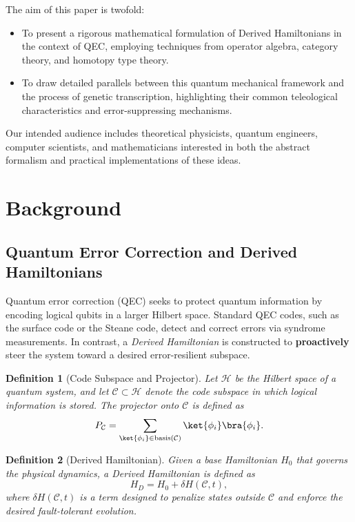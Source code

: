 \documentclass[11pt]{article}
\newtheorem{definition}{Definition}[section]
\begin{document}
The aim of this paper is twofold:
\begin{itemize}
    \item To present a rigorous mathematical formulation of Derived Hamiltonians in the context of QEC, employing techniques from operator algebra, category theory, and homotopy type theory.
    \item To draw detailed parallels between this quantum mechanical framework and the process of genetic transcription, highlighting their common teleological characteristics and error-suppressing mechanisms.
\end{itemize}

Our intended audience includes theoretical physicists, quantum engineers, computer scientists, and mathematicians interested in both the abstract formalism and practical implementations of these ideas.

\section{Background}
\subsection{Quantum Error Correction and Derived Hamiltonians}
Quantum error correction (QEC) seeks to protect quantum information by encoding logical qubits in a larger Hilbert space. Standard QEC codes, such as the surface code or the Steane code, detect and correct errors via syndrome measurements. In contrast, a \emph{Derived Hamiltonian} is constructed to \textbf{proactively} steer the system toward a desired error-resilient subspace.

\begin{definition}[Code Subspace and Projector]
Let $\mathcal{H}$ be the Hilbert space of a quantum system, and let $\mathcal{C} \subset \mathcal{H}$ denote the \emph{code subspace} in which logical information is stored. The projector onto $\mathcal{C}$ is defined as
\[
P_{\mathcal{C}} = \sum_{\ket{\phi_i}\in \mathrm{basis}(\mathcal{C})} \ket{\phi_i}\bra{\phi_i}.
\]
\end{definition}

\begin{definition}[Derived Hamiltonian]
Given a base Hamiltonian $H_0$ that governs the physical dynamics, a \emph{Derived Hamiltonian} is defined as
\[
H_D = H_0 + \delta H(\mathcal{C}, t),
\]
where $\delta H(\mathcal{C}, t)$ is a term designed to penalize states outside $\mathcal{C}$ and enforce the desired fault-tolerant evolution.
\end{definition}
\end{document}
